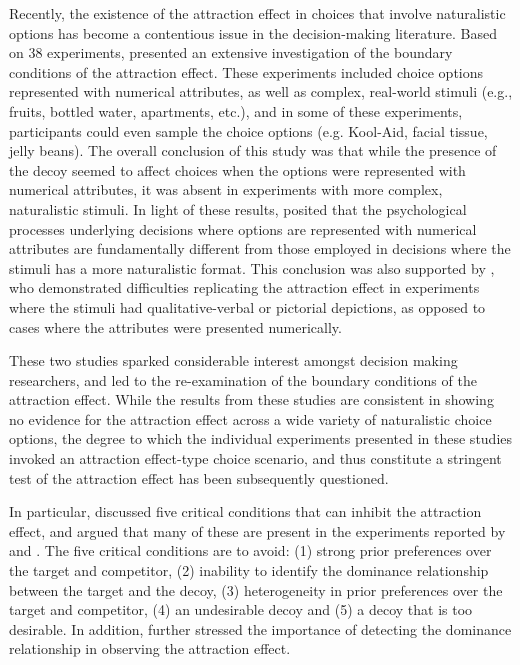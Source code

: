 \documentclass[12pt, a4paper]{article}
\begin{document}
Recently, the existence of the attraction effect in choices that involve naturalistic options has become a contentious issue in the decision-making literature. Based on 38 experiments,  presented an extensive investigation of the boundary conditions of the attraction effect. These experiments included choice options represented with numerical attributes, as well as complex, real-world stimuli (e.g., fruits, bottled water, apartments, etc.), and in some of these experiments, participants could even sample the choice options (e.g. Kool-Aid, facial tissue, jelly beans). The overall conclusion of this study was that while the presence of the decoy seemed to affect choices when the options were represented with numerical attributes, it was absent in experiments with more complex, naturalistic stimuli. In light of these results, \citeauthor{Frederick2014} posited that the psychological processes underlying decisions where options are represented with numerical attributes are fundamentally different from those employed in decisions where the stimuli has a more naturalistic format. This conclusion was also supported by , who demonstrated difficulties replicating the attraction effect in experiments where the stimuli had qualitative-verbal or pictorial depictions, as opposed to cases where the attributes were presented numerically.

These two studies sparked considerable interest amongst decision making researchers, and led to the re-examination of the boundary conditions of the attraction effect. While the results from these studies are consistent in showing no evidence for the attraction effect across a wide variety of naturalistic choice options, the degree to which the individual experiments presented in these studies invoked an attraction effect-type choice scenario, and thus constitute a stringent test of the attraction effect has been subsequently questioned.
  
In particular,  discussed five critical conditions that can inhibit the attraction effect, and argued that many of these are present in the experiments reported by  and . The five critical conditions are to avoid: (1) strong prior preferences over the target and competitor, (2) inability to identify the dominance relationship  between the target and the decoy, (3) heterogeneity in prior preferences over the target and competitor, (4) an undesirable decoy and (5) a decoy that is too desirable. In addition,  further stressed the importance of detecting the dominance relationship in observing the attraction effect.
\end{document}
